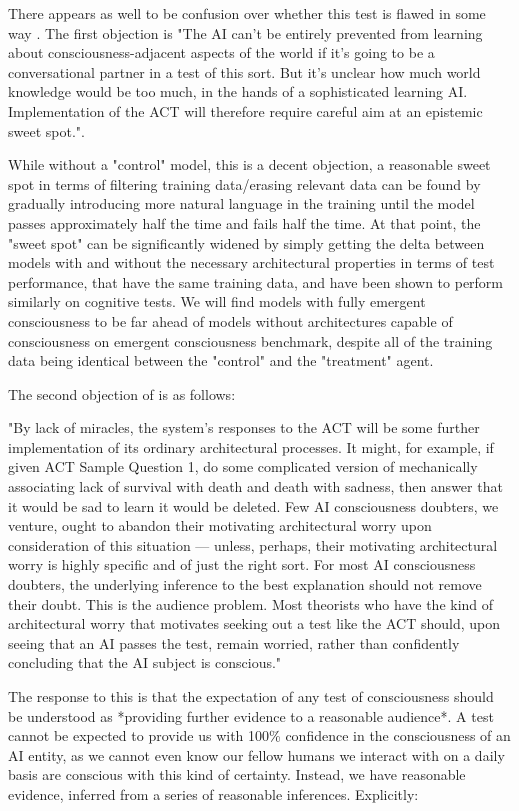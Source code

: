 \documentclass{article}
\begin{document}
There appears as well to be confusion over whether this test is flawed in some way \citep{udell2021schneider}. The first objection is "The AI can’t be entirely prevented from learning about consciousness-adjacent aspects of the world if it’s going to be a conversational partner in a test of this sort. But it’s unclear how much world knowledge would be too much, in the hands of a sophisticated learning AI. Implementation of the ACT will therefore require careful aim at an epistemic sweet spot.".

While without a "control" model, this is a decent objection, a reasonable sweet spot in terms of filtering training data/erasing relevant data can be found by gradually introducing more natural language in the training until the model passes approximately half the time and fails half the time. At that point, the "sweet spot" can be significantly widened by simply getting the delta between models with and without the necessary architectural properties in terms of test performance, that have the same training data, and have been shown to perform similarly on cognitive tests. We will find models with fully emergent consciousness to be far ahead of models without architectures capable of consciousness on emergent consciousness benchmark, despite all of the training data being identical between the "control" and the "treatment" agent.

The second objection of \citep{udell2021schneider} is as follows:

"By lack of miracles, the system’s responses to the ACT will be some further implementation of its ordinary architectural processes.  It might, for example, if given ACT Sample Question 1, do some complicated version of mechanically associating lack of survival with death and death with sadness, then answer that it would be sad to learn it would be deleted.  Few AI consciousness doubters, we venture, ought to abandon their motivating architectural worry upon consideration of this situation — unless, perhaps, their motivating architectural worry is highly specific and of just the right sort.  For most AI consciousness doubters, the underlying inference to the best explanation should not remove their doubt.  This is the audience problem.  Most theorists who have the kind of architectural worry that motivates seeking out a test like the ACT should, upon seeing that an AI passes the test, remain worried, rather than confidently concluding that the AI subject is conscious."

The response to this is that the expectation of any test of consciousness should be understood as *providing further evidence to a reasonable audience*. A test cannot be expected to provide us with 100\% confidence in the consciousness of an AI entity, as we cannot even know our fellow humans we interact with on a daily basis are conscious with this kind of certainty. Instead, we have reasonable evidence, inferred from a series of reasonable inferences. Explicitly:
\end{document}

